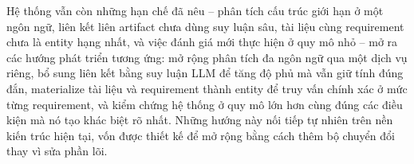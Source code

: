 Hệ thống vẫn còn những hạn chế đã nêu -- phân tích cấu trúc giới hạn ở một ngôn ngữ, liên kết liên artifact chưa dùng suy luận sâu, tài liệu cùng requirement chưa là entity hạng nhất, và việc đánh giá mới thực hiện ở quy mô nhỏ -- mở ra các hướng phát triển tương ứng: mở rộng phân tích đa ngôn ngữ qua một dịch vụ riêng, bổ sung liên kết bằng suy luận LLM để tăng độ phủ mà vẫn giữ tính đúng đắn, materialize tài liệu và requirement thành entity để truy vấn chính xác ở mức từng requirement, và kiểm chứng hệ thống ở quy mô lớn hơn cùng đúng các điều kiện mà nó tạo khác biệt rõ nhất. Những hướng này nối tiếp tự nhiên trên nền kiến trúc hiện tại, vốn được thiết kế để mở rộng bằng cách thêm bộ chuyển đổi thay vì sửa phần lõi.
